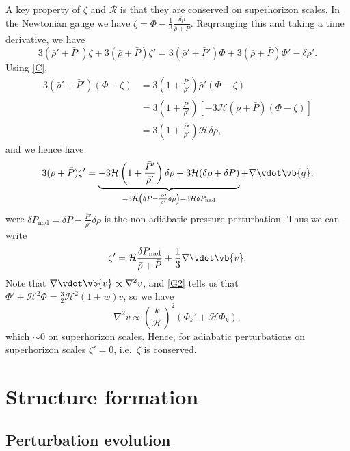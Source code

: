 \documentclass{jknotes}
\begin{document}
A key property of \(\zeta\) and \(\mathcal{R}\) is that they are conserved on superhorizon scales. In the Newtonian gauge we have \(\zeta = \Phi - \frac13\frac{\delta\rho}{\bar\rho+\bar P}\). Reqrranging this and taking a time derivative, we have
\begin{equation}
    3(\bar\rho'+\bar{P}')\zeta + 3(\bar\rho + \bar P)\zeta' = 3(\bar\rho'+\bar{P}')\Phi + 3(\bar\rho+\bar P)\Phi' - \delta\rho'.
\end{equation}
Using \eqref{C}, 
\begin{align}
    3(\bar\rho'+\bar{P}')(\Phi-\zeta) &= 3\left(1+\frac{\bar{P}'}{\bar\rho'}\right)\bar\rho'(\Phi-\zeta) \\
                                      &= 3\left(1+\frac{\bar{P}'}{\bar\rho'}\right)\left[-3\mathcal{H}(\bar\rho+\bar{P})(\Phi-\zeta)\right] \\
                                      &= 3\left(1+\frac{\bar{P}'}{\bar\rho'}\right)\mathcal{H}\delta\rho,
\end{align}
and we hence have
\begin{equation}
    3(\bar\rho+\bar P)\zeta' = \underbrace{-3\mathcal{H}\left(1+\frac{\bar{P}'}{\bar\rho'}\right)\delta\rho + 3\mathcal{H}(\delta\rho+\delta P)}_{=3\mathcal{H}\left(\delta P - \frac{\bar{P}'}{\bar\rho'}\delta\rho\right) = 3\mathcal{H}\delta P_{\mathrm{nad}}} + \nabla\vdot\vb{q},
\end{equation}
were \(\delta P_{\mathrm{nad}} = \delta P - \frac{\bar{P}'}{\bar\rho'}\delta\rho\) is the non-adiabatic pressure perturbation. Thus we can write
\begin{equation}
    \zeta' = \mathcal{H}\frac{\delta P_{\mathrm{nad}}}{\bar\rho + \bar P} + \frac13\nabla\vdot\vb{v}.
\end{equation}
Note that \(\nabla\vdot\vb{v}\propto \nabla^2 v\), and \eqref{G2} tells us that \(\Phi'+\mathcal{H}^2\Phi = \frac32\mathcal{H}^2(1+w)v\), so we have
\begin{equation}
    \nabla^2v\propto \left(\frac{k}{\mathcal{H}}\right)^2(\Phi_k'+\mathcal{H}\Phi_k),
\end{equation}
which \(\sim 0\) on superhorizon scales. Hence, for adiabatic perturbations on superhorizon scales \(\zeta'=0\), i.e.\ \(\zeta\) is conserved.

\section{Structure formation}

\subsection{Perturbation evolution}
\end{document}
